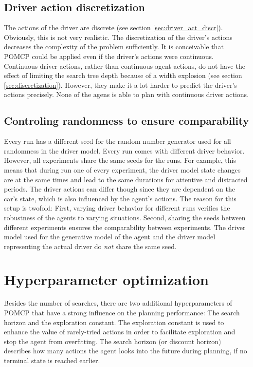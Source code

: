 \subsection{Driver action discretization}

The actions of the driver are discrete (see section \ref{sec:driver_act_discr}). Obviously, this is not very realistic. The discretization of the driver's actions decreases the complexity of the problem sufficiently. It is conceivable that POMCP could be applied even if the driver's actions were continuous. Continuous driver actions, rather than continuous agent actions, do not have the effect of limiting the search tree depth because of a width explosion (see section \ref{sec:discretization}). However, they make it a lot harder to predict the driver's actions precisely. None of the agens is able to plan with continuous driver actions. 

\subsection{Controling randomness to ensure comparability}

Every run has a different seed for the random number generator used for all randomness in the driver model. Every run comes with different driver behavior. However, all experiments share the same seeds for the runs. For example, this means that during run one of every experiment, the driver model state changes are at the same times and lead to the same durations for attentive and distracted periods. The driver actions can differ though since they are dependent on the car's state, which is also influenced by the agent's actions. The reason for this setup is twofold: First, varying driver behavior for different runs verifies the robustness of the agents to varying situations. Second, sharing the seeds between different experiments ensures the comparability between experiments. The driver model used for the generative model of the agent and the driver model representing the actual driver do \emph{not} share the same seed.

\section{Hyperparameter optimization}
\label{sec:exp_hyperparams}

Besides the number of searches, there are two additional hyperparameters of POMCP that have a strong influence on the planning performance: The search horizon and the exploration constant. The exploration constant is used to enhance the value of rarely-tried actions in order to facilitate exploration and stop the agent from overfitting. The search horizon (or discount horizon) describes how many actions the agent looks into the future during planning, if no terminal state is reached earlier.

